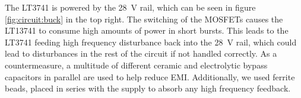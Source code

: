 The LT3741 is powered by the \SI{28}{\volt}  rail, which can be seen in figure
\ref{fig:circuit:buck} in the  top right. The switching of  the MOSFETs causes
the LT13741  to consume high amounts  of power in short  bursts. This leads to
the LT3741  feeding high  frequency disturbance  back into  the \SI{28}{\volt}
rail, which  could lead  to disturbances  in the  rest of  the circuit  if not
handled  correctly.  As  a countermeasure,  a multitude  of different  ceramic
and  electrolytic  bypass capacitors  in  parallel  are  used to  help  reduce
EMI.  Additionally, we used ferrite beads, placed in series with the supply to
absorb any high frequency feedback.
